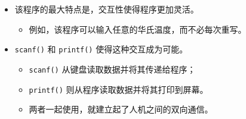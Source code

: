 \begin{frame}[fragile]\ft{\secname}
  \begin{itemize}
  \item
    该程序的最大特点是，交互性使得程序更加灵活。\\[0.1in]
    \begin{itemize}
    \item 例如，该程序可以输入任意的华氏温度，而不必每次重写。\\[0.2in]
    \end{itemize}
  \item  \lstinline|scanf()| 和  \lstinline|printf()| 使得这种交互成为可能。\\[0.1in]
    \begin{itemize}
    \item  \lstinline|scanf()| 从键盘读取数据并将其传递给程序；\\[0.1in]
    \item  \lstinline|printf()| 则从程序读取数据并将其打印到屏幕。\\[0.1in]
    \item 两者一起使用，就建立起了人机之间的双向通信。
    \end{itemize}
  \end{itemize}

\end{frame}




